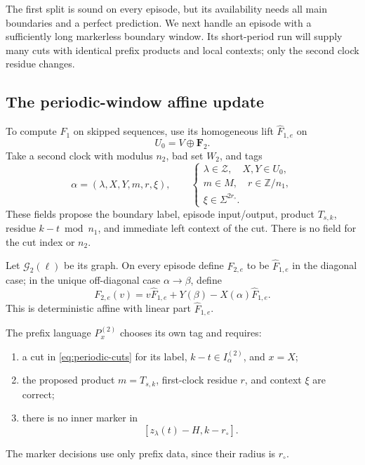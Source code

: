 The first split is sound on every episode, but its availability needs all
main boundaries and a perfect prediction. We next handle an episode with
a sufficiently long markerless boundary window. Its short-period run will
supply many cuts with identical prefix products and local contexts; only
the second clock residue changes.

\subsection{The periodic-window affine update}

To compute \(F_1\) on skipped sequences, use its homogeneous lift
\(\widehat F_{1,e}\) on
\[
                         U_0=V\oplus\mathbf F_2.
\]
Take a second clock with modulus \(n_2\), bad set \(W_2\), and tags
\begin{equation}\label{eq:second-tags}
 \alpha=(\lambda,X,Y,m,r,\xi),\qquad
 \begin{cases}
 \lambda\in\mathcal Z,\quad X,Y\in U_0,\\
 m\in M,\quad r\in\mathbb Z/n_1,\\
 \xi\in\Sigma^{2r_\circ}.
 \end{cases}
\end{equation}
These fields propose the boundary label, episode input/output, product
\(T_{s,k}\), residue \(k-t\bmod n_1\), and immediate left context of the cut.
There is no field for the cut index or \(n_2\).

Let \(\mathcal G_2(\ell)\) be its graph. On every episode define \(F_{2,e}\) to
be \(\widehat F_{1,e}\) in the diagonal case; in the unique off-diagonal case
\(\alpha\to\beta\), define
\begin{equation}\label{eq:second-error}
 F_{2,e}(v)=v\widehat F_{1,e}
       +Y(\beta)-X(\alpha)\widehat F_{1,e}.
\end{equation}
This is deterministic affine with linear part \(\widehat F_{1,e}\).

The prefix language \(P_x^{(2)}\) chooses its own tag and requires:
\begin{enumerate}[label=\textup{(\roman*)}]
\item a cut in \eqref{eq:periodic-cuts} for its label,
\(k-t\in I^{(2)}_\alpha\), and \(x=X\);
\item the proposed product \(m=T_{s,k}\), first-clock residue \(r\), and context
\(\xi\) are correct;
\item there is no inner marker in
\[
                           [z_\lambda(t)-H,k-r_\circ].
\]
\end{enumerate}
The marker decisions use only prefix data, since their radius is \(r_\circ\).

